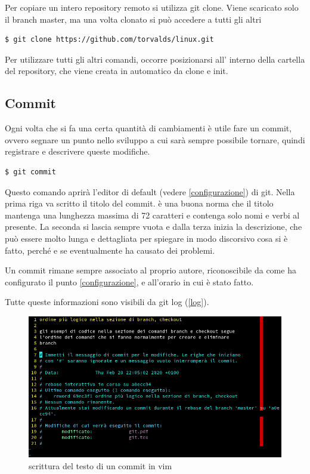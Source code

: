 \documentclass{article} \usepackage[textwidth=19cm,textheight=24cm]{geometry}
\begin{document}
Per copiare un intero repository remoto si utilizza git clone. Viene scaricato
solo il branch master, ma una volta clonato si può accedere a tutti gli altri

\begin{verbatim}
$ git clone https://github.com/torvalds/linux.git
\end{verbatim}

Per utilizzare tutti gli altri comandi, occorre posizionarsi all' interno della
cartella del repository, che viene creata in automatico da clone e init.

\subsection{Commit}

Ogni volta che si fa una certa quantità di cambiamenti è utile fare un commit,
ovvero segnare un punto nello sviluppo a cui sarà sempre possibile tornare,
quindi registrare e descrivere queste modifiche.

\begin{verbatim}
$ git commit
\end{verbatim}

Questo comando aprirà l'editor di default (vedere \ref{configurazione}) di git.
Nella prima riga va scritto il titolo del commit.
è una buona norma che il titolo mantenga una lunghezza massima di 72 caratteri
e contenga solo nomi e verbi al presente.
La seconda si lascia sempre vuota e dalla terza inizia la descrizione, che può essere
molto lunga e dettagliata per spiegare in modo discorsivo cosa si è fatto, 
perché e se eventualmente ha causato dei problemi.

Un commit rimane sempre associato al proprio autore, riconoscibile da come ha
configurato il punto \ref{configurazione}, e all'orario in cui è stato fatto.

Tutte queste informazioni sono visibili da git log (\ref{log}).

\begin{figure}
\includegraphics[width=6in]{vimEditCommit.png}
\centering
\caption{scrittura del testo di un commit in vim}
\end{figure}
\end{document}

